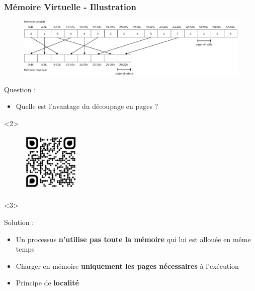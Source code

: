 \documentclass[8pt]{beamer}
\begin{document}
\begin{frame}[c]
    \frametitle{Mémoire Virtuelle - Illustration}
    \begin{figure}
        \centering

        \includegraphics[width=\textwidth]{figures/memoire_virtuelle_physique.pdf}
    \end{figure}
    \begin{alertblock}{Question : }
        \begin{itemize}
            \item
                  Quelle est l'avantage du d\'ecoupage en pages ?
        \end{itemize}
    \end{alertblock}
    \begin{onlyenv}<2>
        \begin{figure}
            \centering
            \includegraphics[width=0.25\textwidth]{figures/qr-code.pdf}
        \end{figure}
    \end{onlyenv}
    \begin{onlyenv}<3>
        \begin{exampleblock}{Solution :}
            \begin{itemize}
                \item Un processus \textbf{n'utilise pas toute la mémoire} qui
                      lui est
                      allouée en même
                      temps
                \item Charger en mémoire \textbf{uniquement les pages
                          nécessaires}
                      à
                      l'exécution
                \item Principe de \textbf{localité}
            \end{itemize}
        \end{exampleblock}
    \end{onlyenv}

\end{frame}
\end{document}

